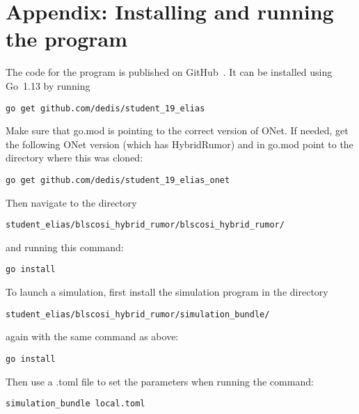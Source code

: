 \section{Appendix: Installing and running the program}
\label{axinstall}

The code for the program is published on GitHub~\cite{SemProjElias}.
It can be installed using Go~1.13 by running
\begin{verbatim}
go get github.com/dedis/student_19_elias
\end{verbatim}

Make sure that go.mod is pointing to the correct version of ONet. If needed, get the following ONet version (which has HybridRumor) and in go.mod point to the directory where this was cloned:
\begin{verbatim}
go get github.com/dedis/student_19_elias_onet
\end{verbatim}

Then navigate to the directory
\begin{verbatim}
student_elias/blscosi_hybrid_rumor/blscosi_hybrid_rumor/
\end{verbatim}
and running this command:
\begin{verbatim}
go install
\end{verbatim}

To launch a simulation, first install the simulation program in the directory
\begin{verbatim}
student_elias/blscosi_hybrid_rumor/simulation_bundle/
\end{verbatim}
again with the same command as above:
\begin{verbatim}
go install
\end{verbatim}
Then use a .toml file to set the parameters when running the command:
\begin{verbatim}
simulation_bundle local.toml
\end{verbatim}